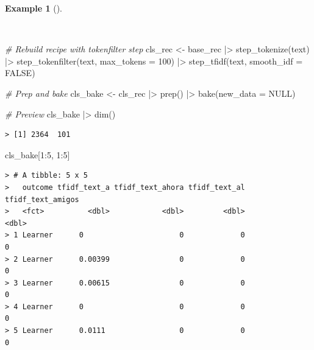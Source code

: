 \documentclass[
  letterpaper,
]{latex/krantz}
\newenvironment{Shaded}{\begin{snugshade}}{\end{snugshade}}
\newcommand{\AttributeTok}[1]{\textcolor[rgb]{0.00,0.00,0.00}{#1}}
\newcommand{\CommentTok}[1]{\textcolor[rgb]{0.00,0.00,0.00}{\textit{#1}}}
\newcommand{\ConstantTok}[1]{\textcolor[rgb]{0.00,0.00,0.00}{#1}}
\newcommand{\DecValTok}[1]{\textcolor[rgb]{0.00,0.00,0.00}{#1}}
\newcommand{\FunctionTok}[1]{\textcolor[rgb]{0.00,0.00,0.00}{#1}}
\newcommand{\NormalTok}[1]{\textcolor[rgb]{0.00,0.00,0.00}{#1}}
\newcommand{\OtherTok}[1]{\textcolor[rgb]{0.00,0.00,0.00}{#1}}
\newcommand{\SpecialCharTok}[1]{\textcolor[rgb]{0.00,0.00,0.00}{#1}}
\theoremstyle{definition}
\newtheorem{example}{Example}[chapter]
\theoremstyle{remark}
\begin{document}
\begin{example}[]\protect\hypertarget{exm-pda-class-recipe-tokenfilter}{}\label{exm-pda-class-recipe-tokenfilter}

~

\begin{Shaded}
\begin{Highlighting}[]
\CommentTok{\# Rebuild recipe with tokenfilter step}
\NormalTok{cls\_rec }\OtherTok{\textless{}{-}}
\NormalTok{  base\_rec }\SpecialCharTok{|\textgreater{}}
  \FunctionTok{step\_tokenize}\NormalTok{(text) }\SpecialCharTok{|\textgreater{}}
  \FunctionTok{step\_tokenfilter}\NormalTok{(text, }\AttributeTok{max\_tokens =} \DecValTok{100}\NormalTok{) }\SpecialCharTok{|\textgreater{}}
  \FunctionTok{step\_tfidf}\NormalTok{(text, }\AttributeTok{smooth\_idf =} \ConstantTok{FALSE}\NormalTok{)}

\CommentTok{\# Prep and bake}
\NormalTok{cls\_bake }\OtherTok{\textless{}{-}}
\NormalTok{  cls\_rec }\SpecialCharTok{|\textgreater{}}
  \FunctionTok{prep}\NormalTok{() }\SpecialCharTok{|\textgreater{}}
  \FunctionTok{bake}\NormalTok{(}\AttributeTok{new\_data =} \ConstantTok{NULL}\NormalTok{)}

\CommentTok{\# Preview}
\NormalTok{cls\_bake }\SpecialCharTok{|\textgreater{}} \FunctionTok{dim}\NormalTok{()}
\end{Highlighting}
\end{Shaded}

\begin{verbatim}
> [1] 2364  101
\end{verbatim}

\begin{Shaded}
\begin{Highlighting}[]
\NormalTok{cls\_bake[}\DecValTok{1}\SpecialCharTok{:}\DecValTok{5}\NormalTok{, }\DecValTok{1}\SpecialCharTok{:}\DecValTok{5}\NormalTok{]}
\end{Highlighting}
\end{Shaded}

\begin{verbatim}
> # A tibble: 5 x 5
>   outcome tfidf_text_a tfidf_text_ahora tfidf_text_al tfidf_text_amigos
>   <fct>          <dbl>            <dbl>         <dbl>             <dbl>
> 1 Learner      0                      0             0                 0
> 2 Learner      0.00399                0             0                 0
> 3 Learner      0.00615                0             0                 0
> 4 Learner      0                      0             0                 0
> 5 Learner      0.0111                 0             0                 0
\end{verbatim}

\end{example}
\end{document}
